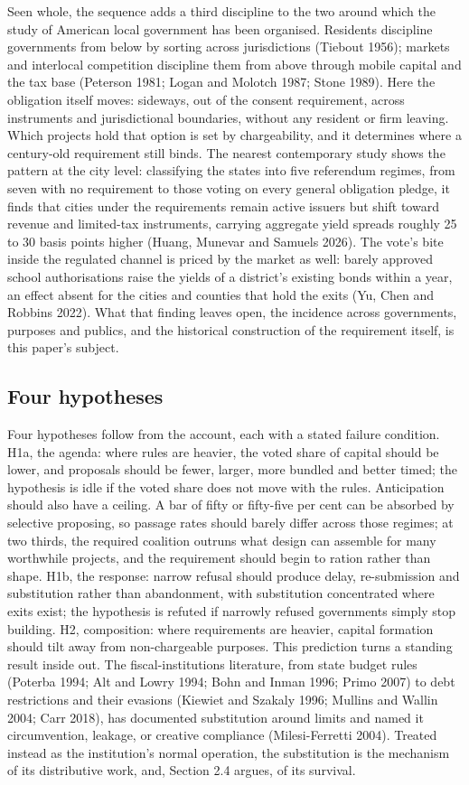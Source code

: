 Seen whole, the sequence adds a third discipline to the two around which the study of American local government has been organised. Residents discipline governments from below by sorting across jurisdictions (Tiebout 1956); markets and interlocal competition discipline them from above through mobile capital and the tax base (Peterson 1981; Logan and Molotch 1987; Stone 1989). Here the obligation itself moves: sideways, out of the consent requirement, across instruments and jurisdictional boundaries, without any resident or firm leaving. Which projects hold that option is set by chargeability, and it determines where a century-old requirement still binds. The nearest contemporary study shows the pattern at the city level: classifying the states into five referendum regimes, from seven with no requirement to those voting on every general obligation pledge, it finds that cities under the requirements remain active issuers but shift toward revenue and limited-tax instruments, carrying aggregate yield spreads roughly 25 to 30 basis points higher (Huang, Munevar and Samuels 2026). The vote's bite inside the regulated channel is priced by the market as well: barely approved school authorisations raise the yields of a district's existing bonds within a year, an effect absent for the cities and counties that hold the exits (Yu, Chen and Robbins 2022). What that finding leaves open, the incidence across governments, purposes and publics, and the historical construction of the requirement itself, is this paper's subject.

\subsection{Four hypotheses}
Four hypotheses follow from the account, each with a stated failure condition. H1a, the agenda: where rules are heavier, the voted share of capital should be lower, and proposals should be fewer, larger, more bundled and better timed; the hypothesis is idle if the voted share does not move with the rules. Anticipation should also have a ceiling. A bar of fifty or fifty-five per cent can be absorbed by selective proposing, so passage rates should barely differ across those regimes; at two thirds, the required coalition outruns what design can assemble for many worthwhile projects, and the requirement should begin to ration rather than shape. H1b, the response: narrow refusal should produce delay, re-submission and substitution rather than abandonment, with substitution concentrated where exits exist; the hypothesis is refuted if narrowly refused governments simply stop building. H2, composition: where requirements are heavier, capital formation should tilt away from non-chargeable purposes. This prediction turns a standing result inside out. The fiscal-institutions literature, from state budget rules (Poterba 1994; Alt and Lowry 1994; Bohn and Inman 1996; Primo 2007) to debt restrictions and their evasions (Kiewiet and Szakaly 1996; Mullins and Wallin 2004; Carr 2018), has documented substitution around limits and named it circumvention, leakage, or creative compliance (Milesi-Ferretti 2004). Treated instead as the institution's normal operation, the substitution is the mechanism of its distributive work, and, Section 2.4 argues, of its survival.

